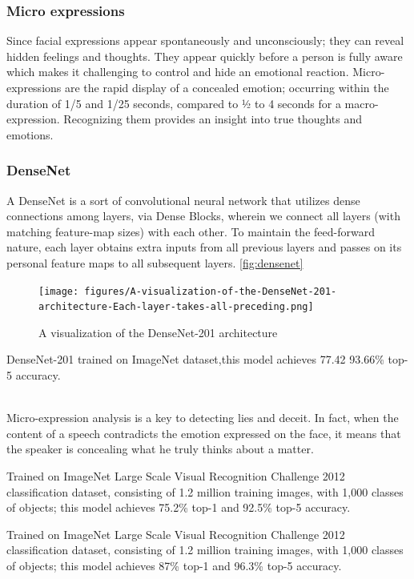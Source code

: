 


\subsubsection{Micro expressions}
Since facial expressions appear spontaneously and unconsciously; they can reveal hidden feelings and thoughts.
They appear quickly before a person is fully aware which makes it challenging to control and hide an emotional reaction. Micro-expressions are the rapid display of a concealed emotion; occurring within the duration of 1/5 and 1/25 seconds, compared to ½ to 4 seconds for a macro-expression.
Recognizing them provides an insight into true thoughts and emotions.

\subsubsection{DenseNet}
A DenseNet is a sort of convolutional neural network that utilizes dense 
connections among layers, via Dense Blocks, wherein we connect all layers (with 
matching feature-map sizes) with each other. To maintain the feed-forward 
nature, each layer obtains extra inputs from all previous layers and passes on its 
personal feature maps to all subsequent layers.
\autoref{fig:densenet}
\begin{figure}[H]
    \centering
    \texttt{[image: figures/A-visualization-of-the-DenseNet-201-architecture-Each-layer-takes-all-preceding.png]}
    \caption{A visualization of the DenseNet-201 architecture}
    \label{fig:densenet}
    \cite{denseNet}
\end{figure}
DenseNet-201 trained on ImageNet dataset,this model achieves 77.42%
93.66\% top-5 accuracy.


\\
Micro-expression analysis is a key to detecting lies and deceit. In fact, when the content of a speech contradicts the emotion expressed on the face, it means that the speaker is concealing what he truly thinks about a matter. 

Trained on ImageNet Large Scale Visual Recognition Challenge 2012 classification dataset, consisting of 1.2 million training images, with 1,000 classes of objects; this model achieves 75.2\% top-1 and 92.5\% top-5 accuracy.

Trained on ImageNet Large Scale Visual Recognition Challenge 2012 classification dataset, consisting of 1.2 million training images, with 1,000 classes of objects; this model achieves 87\% top-1 and 96.3\% top-5 accuracy.


